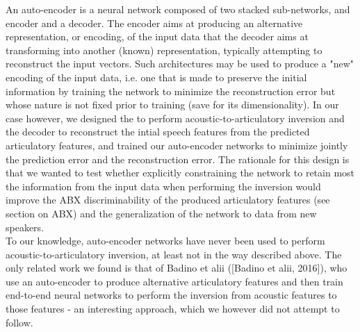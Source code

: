 An auto-encoder is a neural network composed of two stacked sub-networks, and encoder and a decoder. The encoder aims at producing an alternative representation, or encoding, of the input data that the decoder aims at transforming into another (known) representation, typically attempting to reconstruct the input vectors. Such architectures may be used to produce a "new" encoding of the input data, i.e. one that is made to preserve the initial information by training the network to minimize the reconstruction error but whose nature is not fixed prior to training (save for its dimensionality). In our case however, we designed the to perform acoustic-to-articulatory inversion and the decoder to reconstruct the intial speech features from the predicted articulatory features, and trained our auto-encoder networks to minimize jointly the prediction error and the reconstruction error. The rationale for this design is that we wanted to test whether explicitly constraining the network to retain most the information from the input data when performing the inversion would improve the ABX discriminability of the produced articulatory features (see section on ABX) and the generalization of the network to data from new speakers.\\

To our knowledge, auto-encoder networks have never been used to perform acoustic-to-articulatory inversion, at least not in the way described above. The only related work we found is that of Badino et alii ([Badino et alii, 2016]), who use an auto-encoder to produce alternative articulatory features and then train end-to-end neural networks to perform the inversion from acoustic features to those features - an interesting approach, which we however did not attempt to follow.\\


